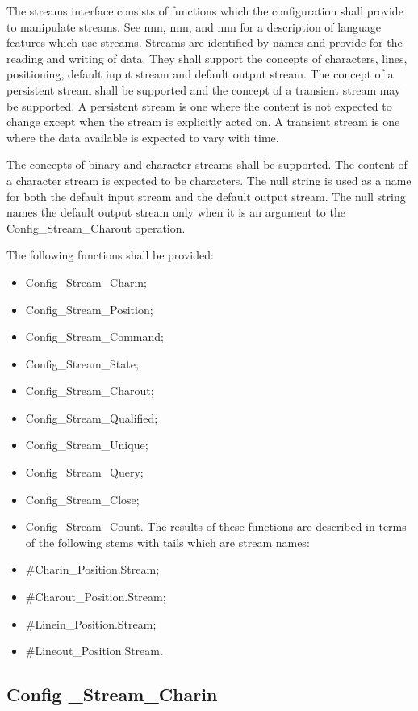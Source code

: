 The streams interface consists of functions which the configuration
shall provide to manipulate streams. See nnn, nnn, and nnn for a
description of language features which use streams. Streams are
identified by names and provide for the reading and writing of data.
They shall support the concepts of characters, lines, positioning,
default input stream and default output stream. The concept of a
persistent stream shall be supported and the concept of a transient
stream may be supported. A persistent stream is one where the content is
not expected to change except when the stream is explicitly acted on. A
transient stream is one where the data available is expected to vary
with time.

The concepts of binary and character streams shall be supported. The
content of a character stream is expected to be characters. The null
string is used as a name for both the default input stream and the
default output stream. The null string names the default output stream
only when it is an argument to the Config\_Stream\_Charout operation.

The following functions shall be provided:

\begin{itemize}
\item
  Config\_Stream\_Charin;
\item
  Config\_Stream\_Position;
\item
  Config\_Stream\_Command;
\item
  Config\_Stream\_State;
\item
  Config\_Stream\_Charout;
\item
  Config\_Stream\_Qualified;
\item
  Config\_Stream\_Unique;
\item
  Config\_Stream\_Query;
\item
  Config\_Stream\_Close;
\item
  Config\_Stream\_Count. The results of these functions are described in
  terms of the following stems with tails which are stream names:
\item
  \#Charin\_Position.Stream;
\item
  \#Charout\_Position.Stream;
\item
  \#Linein\_Position.Stream;
\item
  \#Lineout\_Position.Stream.
\end{itemize}

\subsection{Config \_Stream\_Charin}\label{config-_stream_charin}


